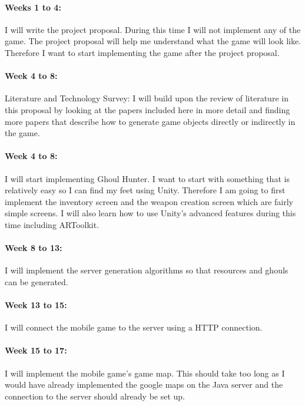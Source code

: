 \documentclass[11pt,openright,a4paper]{report}
\begin{document}
		\paragraph{Weeks 1 to 4:} I will write the project proposal. During this time I will not implement any of the game. The project proposal will help me understand what the game will look like. Therefore I want to start implementing the game after the project proposal.
		\newline
		\paragraph{Week 4 to 8:} Literature and Technology Survey: I will build upon the review of literature in this proposal by looking at the papers included here in more detail and finding more papers that describe how to generate game objects directly or indirectly in the game.
		\newline
		\paragraph{Week 4 to 8:} I will start implementing Ghoul Hunter. I want to start with something that is relatively easy so I can find my feet using Unity. Therefore I am going to first implement the inventory screen and the weapon creation screen which are fairly simple screens. I will also learn how to use Unity's advanced features during this time including ARToolkit.
		\newline
		\paragraph{Week 8 to 13:} I will implement the server generation algorithms so that resources and ghouls can be generated. 
		\newline
		\paragraph{Week 13 to 15:} I will connect the mobile game to the server using a HTTP connection. 
		\newline
		\paragraph{Week 15 to 17:} I will implement the mobile game's game map. This should take too long as I would have already implemented the google maps on the Java server and the connection to the server should already be set up.
		\newline
\end{document}
